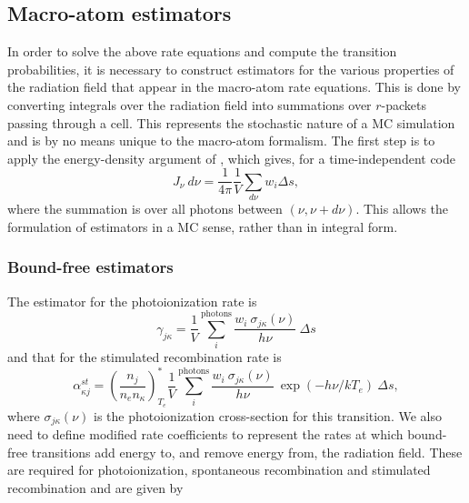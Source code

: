 \subsection{Macro-atom estimators}
\label{sec:estimators}
In order to solve the above rate equations and compute the transition 
probabilities, it is necessary to construct estimators for the various properties
of the radiation field that appear in the macro-atom rate equations. This is done
by converting integrals over the radiation field into summations over 
$r$-packets passing through a cell. This represents the stochastic nature of
a MC simulation and is by no means unique to the macro-atom formalism.
The first step is to apply the energy-density argument of \cite{lucy1999radeq},
which gives, for a time-independent code
\begin{equation}
J_\nu~d\nu = \frac{1}{4\pi}\frac{1}{V} \sum_{d\nu} w_i \Delta s,
\end{equation}
where the summation is over all photons between $(\nu, \nu+d\nu)$. This allows
the formulation of estimators in a MC sense, rather than in integral form. 

\subsubsection{Bound-free estimators}
The estimator for the photoionization rate is
\begin{equation}
\gamma_{j\kappa} = \frac{1}{V} \sum_i^{\mathrm{photons}} 
\frac{w_i~\sigma_{j\kappa}({\nu})}{h \nu}~\Delta s
\end{equation}
and that for the stimulated recombination rate is
\begin{equation}
\alpha_{\kappa j}^{st} =\left( \frac{n_j}{n_e n_\kappa} \right)^*_{T_e}
\frac{1}{V} \sum_i^{\mathrm{photons}} 
\frac{w_i~\sigma_{j\kappa}({\nu})}{h \nu}
~\exp(-h\nu/kT_e)~\Delta s,
\end{equation}
where $\sigma_{j\kappa} (\nu)$ is the photoionization cross-section for this transition.
We also need to define modified rate coefficients to represent
the rates at which bound-free transitions add energy to, and remove energy from, 
the radiation field. These are required for photoionization, 
spontaneous recombination and stimulated recombination and are given by


